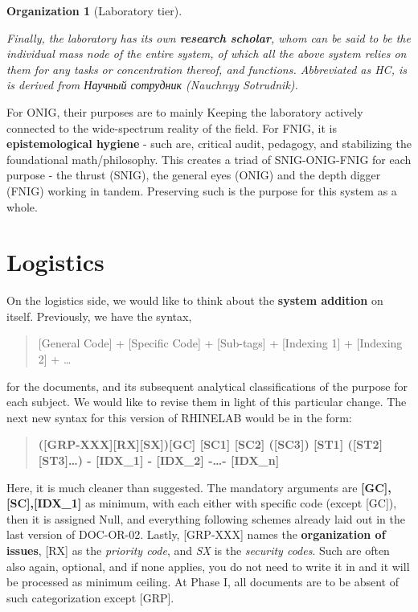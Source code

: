 \documentclass[10pt,a4paper]{article}
\newtheorem{org}{Organization}[section]
\begin{document}
\begin{org}[Laboratory tier]
\begin{itemize}
    \end{itemize}
    Finally, the laboratory has its own \textbf{research scholar}, whom can be said to be the individual mass node of the entire system, of which all the above system relies on them for any tasks or concentration thereof, and functions. Abbreviated as HC, is is derived from \foreignlanguage{russian}{Научный сотрудник} (Nauchnyy Sotrudnik). 
\end{org}

For ONIG, their purposes are to mainly Keeping the laboratory actively connected to the wide-spectrum reality of the field. For FNIG, it is \textbf{epistemological hygiene} - such are, critical audit, pedagogy, and stabilizing the foundational math/philosophy. This creates a triad of SNIG-ONIG-FNIG for each purpose - the thrust (SNIG), the general eyes (ONIG) and the depth digger (FNIG) working in tandem. Preserving such is the purpose for this system as a whole. 

\section{Logistics}

On the logistics side, we would like to think about the \textbf{system addition} on itself. Previously, we have the syntax, 
\begin{quote}
    [General Code] + [Specific Code] + [Sub-tags] + [Indexing 1] + [Indexing 2] + \dots
\end{quote}
for the documents, and its subsequent analytical classifications of the purpose for each subject. We would like to revise them in light of this particular change. The next new syntax for this version of RHINELAB would be in the form: 
\begin{quote}
\textbf{([GRP-XXX][RX][SX])\textcolor{GCColor}{[GC]}
\textcolor{SCColor}{[SC1]}
\textcolor{SCOptColor}{[SC2]}
(\textcolor{SCOptColor}{[SC3]})
\textcolor{STOptColor}{[ST1]}
(\textcolor{STOptColor}{[ST2][ST3]\dots})
-
\textcolor{IDXColor}{[IDX\_1]}
-
\textcolor{IDXOptColor}{[IDX\_2]}
-\dots-
\textcolor{IDXOptColor}{[IDX\_n]}}
\end{quote}
Here, it is much cleaner than suggested. The mandatory arguments are \textbf{[GC],[SC],[IDX\_1]} as minimum, with each either with specific code (except [GC]), then it is assigned \textsf{Null}, and everything following schemes already laid out in the last version of DOC-OR-02. Lastly, [GRP-XXX] names the \textbf{organization of issues}, [RX] as the \textit{priority code}, and \textit{SX} is the \textit{security codes}. Such are often also again, optional, and if none applies, you do not need to write it in and it will be processed as minimum ceiling. At Phase I, all documents are to be absent of such categorization except [GRP]. 
\end{document}
